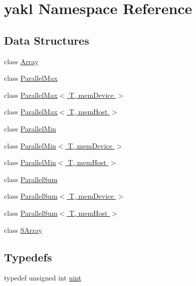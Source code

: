 \hypertarget{namespaceyakl}{}\section{yakl Namespace Reference}
\label{namespaceyakl}
\subsection*{Data Structures}
\begin{DoxyCompactItemize}
\item 
class \hyperlink{classyakl_1_1Array}{Array}
\item 
class \hyperlink{classyakl_1_1ParallelMax}{Parallel\+Max}
\item 
class \hyperlink{classyakl_1_1ParallelMax_3_01T_00_01memDevice_01_4}{Parallel\+Max$<$ T, mem\+Device $>$}
\item 
class \hyperlink{classyakl_1_1ParallelMax_3_01T_00_01memHost_01_4}{Parallel\+Max$<$ T, mem\+Host $>$}
\item 
class \hyperlink{classyakl_1_1ParallelMin}{Parallel\+Min}
\item 
class \hyperlink{classyakl_1_1ParallelMin_3_01T_00_01memDevice_01_4}{Parallel\+Min$<$ T, mem\+Device $>$}
\item 
class \hyperlink{classyakl_1_1ParallelMin_3_01T_00_01memHost_01_4}{Parallel\+Min$<$ T, mem\+Host $>$}
\item 
class \hyperlink{classyakl_1_1ParallelSum}{Parallel\+Sum}
\item 
class \hyperlink{classyakl_1_1ParallelSum_3_01T_00_01memDevice_01_4}{Parallel\+Sum$<$ T, mem\+Device $>$}
\item 
class \hyperlink{classyakl_1_1ParallelSum_3_01T_00_01memHost_01_4}{Parallel\+Sum$<$ T, mem\+Host $>$}
\item 
class \hyperlink{classyakl_1_1SArray}{S\+Array}
\end{DoxyCompactItemize}
\subsection*{Typedefs}
\begin{DoxyCompactItemize}
\item 
typedef unsigned int \hyperlink{namespaceyakl_ad77ef6d92b742f4415930d8a33321ac7}{uint}
\end{DoxyCompactItemize}
